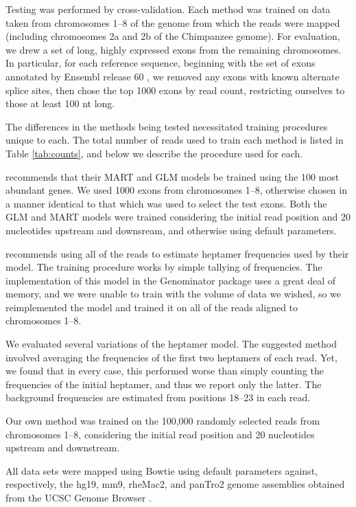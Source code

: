 \documentclass{bioinfo}
\begin{document}
Testing was performed by cross-validation. Each method was trained on data taken
from chromosomes 1--8 of the genome from which the reads were mapped (including
chromosomes 2a and 2b of the Chimpanzee genome). For evaluation, we drew a set
of long, highly expressed exons from the remaining chromosomes. In particular,
for each reference sequence, beginning with the set of exons annotated by
Ensembl release 60 \cite{Hubbard2009}, we removed any exons with known alternate
splice sites, then chose the top 1000 exons by read count, restricting ourselves
to those at least 100 nt long.

The differences in the methods being tested necessitated training procedures
unique to each. The total number of reads used to train each method is listed in
Table \ref{tab:counts}, and below we describe the procedure used for
each.

\citet{Li2010} recommends that their MART and GLM models be trained using the
100 most abundant genes. We used 1000 exons from chromosomes 1--8, otherwise
chosen in a manner identical to that which was used to select the test exons.
Both the GLM and MART models were trained considering the initial read position
and 20 nucleotides upstream and downsream, and otherwise using default
parameters.

\citet{Hansen2010} recommends using all of the reads to estimate heptamer
frequencies used by their model. The training procedure works by simple tallying
of frequencies. The implementation of this model in the Genominator package
uses a great deal of memory, and we were unable to train with the volume of
data we wished, so we reimplemented the model and trained it on all of the reads
aligned to chromosomes 1--8.

We evaluated several variations of the heptamer model. The suggested method
involved averaging the frequencies of the first two heptamers of each read. Yet,
we found that in every case, this performed worse than simply counting the
frequencies of the initial heptamer, and thus we report only the latter. The
background frequencies are estimated from positions 18--23 in each read.

Our own method was trained on the 100,000 randomly selected reads from
chromosomes 1--8, considering the initial read position and 20 nucleotides
upstream and downstream.

All data sets were mapped using Bowtie \citep{Langmead2009} using default
parameters against, respectively, the hg19, mm9, rheMac2, and panTro2 genome
assemblies obtained from the UCSC Genome Browser \citep{Karolchik2008}.
\end{document}

